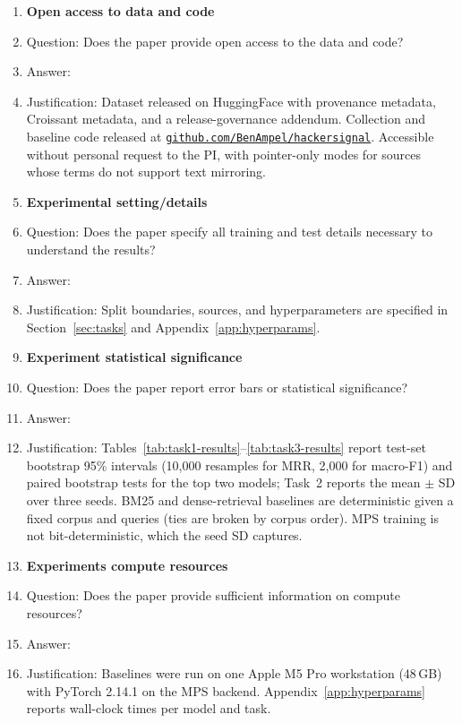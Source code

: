 \documentclass{article}
\begin{document}
\begin{enumerate}
\item {\bf Open access to data and code}
    \item[] Question: Does the paper provide open access to the data and code?
    \item[] Answer: \answerYes{}
    \item[] Justification: Dataset released on HuggingFace with provenance metadata, Croissant metadata, and a release-governance addendum. Collection and baseline code released at \href{https://github.com/BenAmpel/hackersignal}{\texttt{github.com/BenAmpel/hackersignal}}. Accessible without personal request to the PI, with pointer-only modes for sources whose terms do not support text mirroring.

\item {\bf Experimental setting/details}
    \item[] Question: Does the paper specify all training and test details necessary to understand the results?
    \item[] Answer: \answerYes{}
    \item[] Justification: Split boundaries, sources, and hyperparameters are specified in Section~\ref{sec:tasks} and Appendix~\ref{app:hyperparams}.

\item {\bf Experiment statistical significance}
    \item[] Question: Does the paper report error bars or statistical significance?
    \item[] Answer: \answerYes{}
    \item[] Justification: Tables~\ref{tab:task1-results}--\ref{tab:task3-results} report test-set bootstrap 95\% intervals (10,000 resamples for MRR, 2,000 for macro-F1) and paired bootstrap tests for the top two models; Task~2 reports the mean $\pm$ SD over three seeds. BM25 and dense-retrieval baselines are deterministic given a fixed corpus and queries (ties are broken by corpus order). MPS training is not bit-deterministic, which the seed SD captures.

\item {\bf Experiments compute resources}
    \item[] Question: Does the paper provide sufficient information on compute resources?
    \item[] Answer: \answerYes{}
    \item[] Justification: Baselines were run on one Apple M5 Pro workstation (48\,GB) with PyTorch 2.14.1 on the MPS backend. Appendix~\ref{app:hyperparams} reports wall-clock times per model and task.


\end{enumerate}
\end{document}
